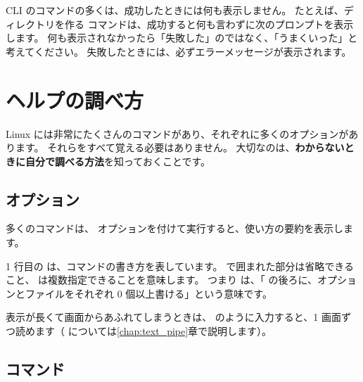 \begin{point}[便りがないのはよい便り]
  CLI のコマンドの多くは、成功したときには何も表示しません。
  たとえば、ディレクトリを作る  コマンドは、成功すると何も言わずに次のプロンプトを表示します。
  何も表示されなかったら「失敗した」のではなく、「うまくいった」と考えてください。
  失敗したときには、必ずエラーメッセージが表示されます。
\end{point}

\section{ヘルプの調べ方}
\label{sec:terminal-help}

Linux には非常にたくさんのコマンドがあり、それぞれに多くのオプションがあります。
それらをすべて覚える必要はありません。
大切なのは、\textbf{わからないときに自分で調べる方法}を知っておくことです。

\subsection{ オプション}

多くのコマンドは、 オプションを付けて実行すると、使い方の要約を表示します。


1 行目の  は、コマンドの書き方を表しています。
\cmd{[ ]} で囲まれた部分は省略できること、 は複数指定できることを意味します。
つまり  は、「 の後ろに、オプションとファイルをそれぞれ 0 個以上書ける」という意味です。

表示が長くて画面からあふれてしまうときは、 のように入力すると、1 画面ずつ読めます（\cmd{|} については\ref{chap:text_pipe}章で説明します）。

\subsection{ コマンド}

